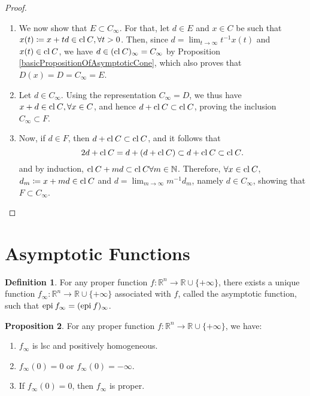 \documentclass[a4paper,11pt, oneside]{book}
\theoremstyle{definition}
\newtheorem{dfn}{Definition}[section]
\newtheorem{prop}[dfn]{Proposition}
\newcommand{\NaturalNumberSet}{\mathbb{N}}
\newcommand{\RealNumberSet}{\mathbb{R}}
\newcommand{\NDemenstionalRealEuclideanSpace}{\mathbb{R}^n}
\newcommand{\Closure}[1]{\text{\rm cl\:${#1}$}} %
\newcommand{\Epigraph}[1]{\text{\rm epi\:${#1}$}} %
\newcommand{\ExtendedRealValuedFunction}[2]{{#1}: {#2} \to \RealNumberSet \cup \{+\infty\}}
\begin{document}
\begin{proof}
\begin{enumerate}[label=\roman*,align=CenterWithParen]
    \item We now show that $E \subset C_{\infty}$. For that, let $d \in E$ and $x \in C$ be such that $x(t) \coloneqq x + td \in \Closure{C}, \forall t>0$. Then, since $d = \lim_{t \to \infty} t^{-1}x(t)$ and $x(t) \in \Closure{C}$, we have $d \in (\Closure{C})_{\infty} = C_{\infty}$ by Proposition \ref{basicPropositionOfAsymptoticCone}, which also proves that $D(x) = D = C_{\infty} = E$.
    \item Let $d \in C_{\infty}$. Using the representation $C_{\infty} = D$, we thus have $x+d \in \Closure{C}, \forall x \in C$, and hence $d + \Closure{C} \subset \Closure{C}$, proving the inclusion $C_{\infty} \subset F$.
    \item Now, if $d \in F$, then $d + \Closure{C} \subset \Closure{C}$, and it follows that
    \begin{equation}
      2d + \Closure{C} = d + (d + \Closure{C}) \subset d + \Closure{C} \subset \Closure{C}. \notag
    \end{equation}
    and by induction, $\Closure{C} + md \subset \Closure{C} \forall m\in \NaturalNumberSet$. Therefore, $\forall x \in \Closure{C}$, $d_m \coloneqq x+md \in \Closure{C}$ and $d = \lim_{m \to \infty} m^{-1}d_m$, namely $d \in C_{\infty}$, showing that $F \subset C_{\infty}$.
  \end{enumerate}
\end{proof}

\section{Asymptotic Functions}

\begin{dfn}
  For any proper function $\ExtendedRealValuedFunction{f}{\NDemenstionalRealEuclideanSpace}$, there exists a unique function $\ExtendedRealValuedFunction{f_{\infty}}{\NDemenstionalRealEuclideanSpace}$ associated with $f$, called the asymptotic function, such that $\Epigraph{f_\infty} = (\Epigraph{f})_{\infty}$.
\end{dfn}

\begin{prop}
  For any proper function $\ExtendedRealValuedFunction{f}{\NDemenstionalRealEuclideanSpace}$, we have:
  \begin{enumerate}[label=\roman*,align=CenterWithParen]
    \item $f_{\infty}$ is lsc and positively homogeneous.
    \item $f_{\infty}(0) = 0$ or $f_{\infty}(0) = - \infty$.
    \item If $f_{\infty}(0) = 0$, then $f_{\infty}$ is proper.
  \end{enumerate}
\end{prop}
\end{document}
